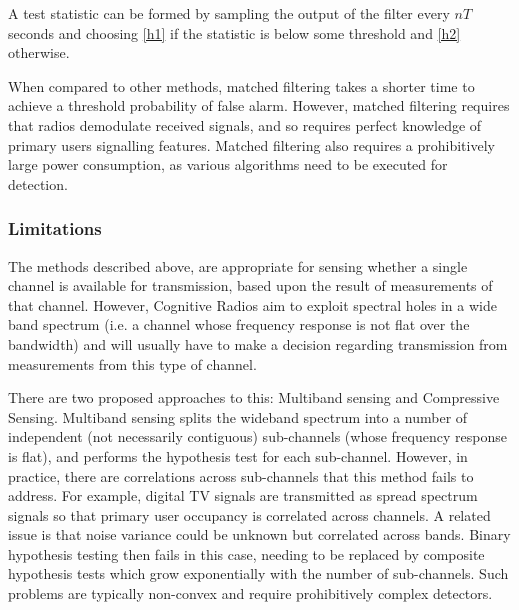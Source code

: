 A test statistic can be formed by sampling the output of the filter every \(nT\) seconds and choosing \ref{h1} if the statistic is below some threshold and \ref{h2} otherwise.

When compared to other methods, matched filtering takes a shorter time to achieve a threshold probability of false alarm. However, matched filtering requires that radios demodulate received signals, and so requires perfect knowledge of primary users signalling features. Matched filtering also requires a prohibitively large power consumption, as various algorithms need to be executed for detection.

\subsubsection{Limitations}
The methods described above, are appropriate for sensing whether a single channel is available for transmission, based upon the result of measurements of that channel. However, Cognitive Radios aim to exploit spectral holes in a wide band spectrum (i.e. a channel whose frequency response is not flat over the bandwidth) and will usually have to make a decision regarding transmission from measurements from this type of channel.

There are two proposed approaches to this: Multiband sensing and Compressive Sensing. Multiband sensing splits the wideband spectrum into a number of independent (not necessarily contiguous) sub-channels (whose frequency response is flat), and performs the hypothesis test for each sub-channel. However, in practice, there are correlations across sub-channels that this method fails to address. For example, digital TV signals are transmitted as spread spectrum signals so that primary user occupancy is correlated across channels. A related issue is that noise variance could be unknown but correlated across bands. Binary hypothesis testing then fails in this case, needing to be replaced by composite hypothesis tests which grow exponentially with the number of sub-channels. Such problems are typically non-convex and require prohibitively complex detectors.

